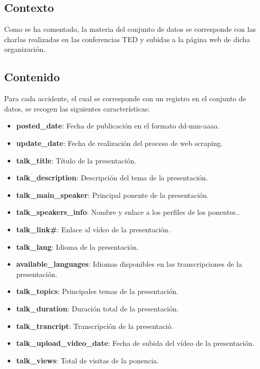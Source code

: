 \documentclass[
]{article}
\providecommand{\tightlist}{%
  \setlength{\itemsep}{0pt}\setlength{\parskip}{0pt}}
\begin{document}
\hypertarget{contexto}{%
\subsection{Contexto}\label{contexto}}

Como se ha comentado, la materia del conjunto de datos se corresponde
con las charlas realizadas en las conferencias TED y subidas a la página
web de dicha organización.

\hypertarget{contenido}{%
\subsection{Contenido}\label{contenido}}

Para cada accidente, el cual se corresponde con un registro en el
conjunto de datos, se recogen las siguientes características:

\begin{itemize}
\tightlist
\item
  \textbf{posted\_date}: Fecha de publicación en el formato
  dd-mm-aaaa.\\
\item
  \textbf{update\_date}: Fecha de realización del proceso de web
  scraping.\\
\item
  \textbf{talk\_title}: Título de la presentación.\\
\item
  \textbf{talk\_description}: Descripción del tema de la presentación.\\
\item
  \textbf{talk\_main\_speaker}: Principal ponente de la presentación.\\
\item
  \textbf{talk\_speakers\_info}: Nombre y enlace a los perfiles de los
  ponentes..\\
\item
  \textbf{talk\_link\#}: Enlace al vídeo de la presentación.\\
\item
  \textbf{talk\_lang}: Idioma de la presentación.\\
\item
  \textbf{available\_languages}: Idiomas disponibles en las
  transcripciones de la presentación.\\
\item
  \textbf{talk\_topics}: Principales temas de la presentación.\\
\item
  \textbf{talk\_duration}: Duración total de la presentación.\\
\item
  \textbf{talk\_trancript}: Transcripción de la presentació.
\item
  \textbf{talk\_upload\_video\_date}: Fecha de subida del vídeo de la
  presentación.\\
\item
  \textbf{talk\_views}: Total de visitas de la ponencia.
\end{itemize}
\end{document}
